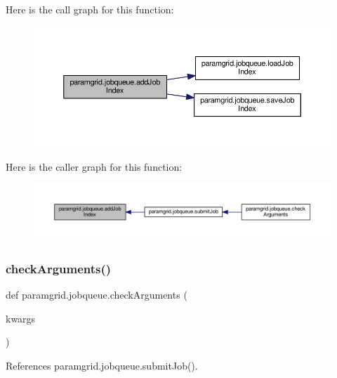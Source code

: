 Here is the call graph for this function\+:
\nopagebreak
\begin{figure}[H]
\begin{center}
\leavevmode
\includegraphics[width=350pt]{namespaceparamgrid_1_1jobqueue_a52e2a5b1c164e5eb20746d45d7005621_cgraph}
\end{center}
\end{figure}
Here is the caller graph for this function\+:
\nopagebreak
\begin{figure}[H]
\begin{center}
\leavevmode
\includegraphics[width=350pt]{namespaceparamgrid_1_1jobqueue_a52e2a5b1c164e5eb20746d45d7005621_icgraph}
\end{center}
\end{figure}
\mbox{\label{namespaceparamgrid_1_1jobqueue_a8887b30e1e0ae144c205ce0bdbb10f70}} 
\subsubsection{\texorpdfstring{check\+Arguments()}{checkArguments()}}
{\footnotesize\ttfamily def paramgrid.\+jobqueue.\+check\+Arguments (\begin{DoxyParamCaption}\item[{}]{kwargs }\end{DoxyParamCaption})}



References paramgrid.\+jobqueue.\+submit\+Job().

